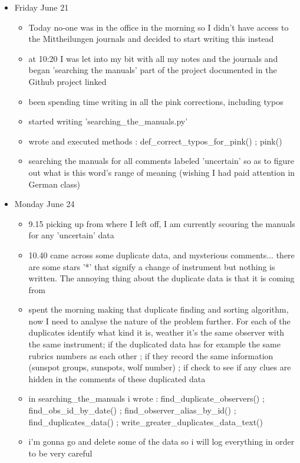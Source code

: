 \documentclass[12pt]{article}
\begin{document}
\begin{itemize}
    \item Friday June 21
    \begin{itemize}
        \item Today no-one was in the office in the morning so I didn't have access to the Mittheilungen journals and decided to start writing this instead
        \item at 10:20 I was let into my bit with all my notes and the journals and began 'searching the manuals' part of the project documented in the Github project linked
        \item been spending time writing in all the pink corrections, including typos
        \item started writing 'searching\_the\_manuals.py'
        \item wrote and executed methods : def\_correct\_typos\_for\_pink() ; pink()
        \item searching the manuals for all comments labeled 'uncertain' so as to figure out what is this word's range of meaning (wishing I had paid attention in German class)
    \end{itemize}
    \item Monday June 24
    \begin{itemize}
        \item 9.15 picking up from where I left off, I am currently scouring the manuals for any 'uncertain' data
        \item 10.40 came across some duplicate data, and mysterious comments... there are some stars '*' that signify a change of instrument but nothing is written. The annoying thing about the duplicate data is that it is coming from 
        \item spent the morning making that duplicate finding and sorting algorithm, now I need to analyse the nature of the problem further. For each of the duplicates identify what kind it is, weather it's the same observer with the same instrument; if the duplicated data has for example the same rubrics numbers as each other ; if they record the same information (sunspot groups, sunspots, wolf number) ; if check to see if any clues are hidden in the comments of these duplicated data
        \item in searching\_the\_manuals i wrote : find\_duplicate\_observers() ; find\_obs\_id\_by\_date() ; find\_observer\_alias\_by\_id() ; find\_duplicates\_data() ; write\_greater\_duplicates\_data\_text()
        \item i'm gonna go and delete some of the data so i will log everything in order to be very careful

\end{itemize}
\end{itemize}
\end{document}
